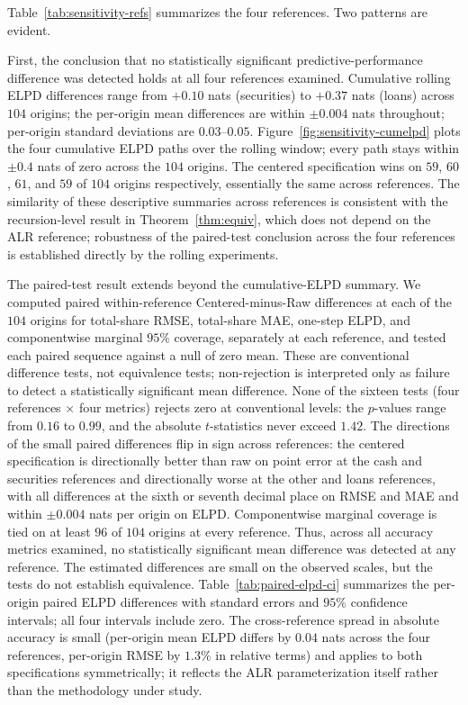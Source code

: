 \documentclass[12pt]{article}
\theoremstyle{remark}
\begin{document}
Table~\ref{tab:sensitivity-refs} summarizes the four references. Two patterns are evident.

First, the conclusion that no statistically significant predictive-performance difference was detected holds at all four references examined. Cumulative rolling ELPD differences range from $+0.10$ nats (securities) to $+0.37$ nats (loans) across $104$ origins; the per-origin mean differences are within $\pm 0.004$ nats throughout; per-origin standard deviations are $0.03$--$0.05$. Figure~\ref{fig:sensitivity-cumelpd} plots the four cumulative ELPD paths over the rolling window; every path stays within $\pm 0.4$ nats of zero across the $104$ origins. The centered specification wins on $59$, $60$, $61$, and $59$ of $104$ origins respectively, essentially the same across references. The similarity of these descriptive summaries across references is consistent with the recursion-level result in Theorem~\ref{thm:equiv}, which does not depend on the ALR reference; robustness of the paired-test conclusion across the four references is established directly by the rolling experiments.

The paired-test result extends beyond the cumulative-ELPD summary. We computed paired within-reference Centered-minus-Raw differences at each of the $104$ origins for total-share RMSE, total-share MAE, one-step ELPD, and componentwise marginal $95\%$ coverage, separately at each reference, and tested each paired sequence against a null of zero mean. These are conventional difference tests, not equivalence tests; non-rejection is interpreted only as failure to detect a statistically significant mean difference. None of the sixteen tests (four references $\times$ four metrics) rejects zero at conventional levels: the $p$-values range from $0.16$ to $0.99$, and the absolute $t$-statistics never exceed $1.42$. The directions of the small paired differences flip in sign across references: the centered specification is directionally better than raw on point error at the cash and securities references and directionally worse at the other and loans references, with all differences at the sixth or seventh decimal place on RMSE and MAE and within $\pm 0.004$ nats per origin on ELPD. Componentwise marginal coverage is tied on at least $96$ of $104$ origins at every reference. Thus, across all accuracy metrics examined, no statistically significant mean difference was detected at any reference. The estimated differences are small on the observed scales, but the tests do not establish equivalence. Table~\ref{tab:paired-elpd-ci} summarizes the per-origin paired ELPD differences with standard errors and $95\%$ confidence intervals; all four intervals include zero. The cross-reference spread in absolute accuracy is small (per-origin mean ELPD differs by $0.04$ nats across the four references, per-origin RMSE by $1.3\%$ in relative terms) and applies to both specifications symmetrically; it reflects the ALR parameterization itself rather than the methodology under study.
\end{document}
